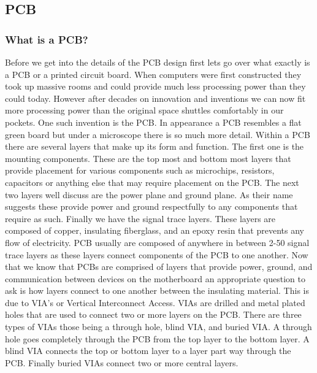 \subsection{PCB}
\subsubsection{What is a PCB?}
Before we get into the details of the PCB design first lets go over what exactly is a PCB or a printed circuit board. When computers were first constructed they took up massive rooms and could provide much less processing power than they could today. However after decades on innovation and inventions we can now fit more processing power than the original space shuttles comfortably in our pockets. One such invention is the PCB. In appearance a PCB resembles a flat green board but under a microscope there is so much more detail. Within a PCB there are several layers that make up its form and function. The first one is the mounting components. These are the top most and bottom most layers that provide placement for various components such as microchips, resistors, capacitors or anything else that may require placement on the PCB. The next two layers well discuss are the power plane and ground plane. As their name suggests these provide power and ground respectfully to any components that require as such. Finally we have the signal trace layers. These layers are composed of copper, insulating fiberglass, and an epoxy resin that prevents any flow of electricity. PCB usually are composed of anywhere in between 2-50 signal trace layers as these layers connect components of the PCB to one another. 
Now that we know that PCBs are comprised of layers that provide power, ground, and communication between devices on the motherboard an appropriate question to ask is how layers connect to one another between the insulating material. This is due to VIA's or Vertical Interconnect Access. VIAs are drilled and metal plated holes that are used to connect two or more layers on the PCB. There are three types of VIAs those being a through hole, blind VIA, and buried VIA. A through hole goes completely through the PCB from the top layer to the bottom layer. A blind VIA connects the top or bottom layer to a layer part way through the PCB. Finally buried VIAs connect two or more central layers. 
